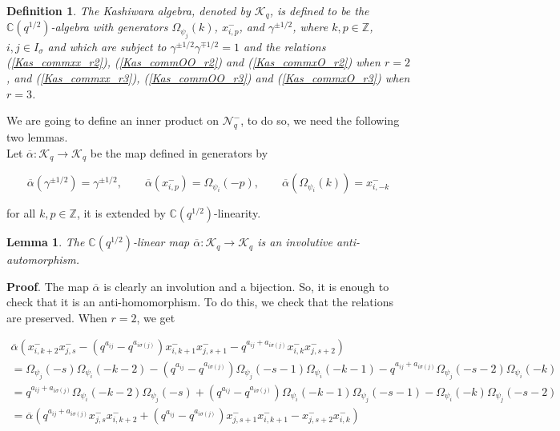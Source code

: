 \documentclass[12pt]{amsart}
\newtheorem{lem}[thm]{Lemma}
\newtheorem{defi}[thm]{Definition}
\numberwithin{equation}{section}
\newcommand{\dem }{\noindent\textbf{Proof}. }
\newcommand{\Z}{\ensuremath{\mathbb{Z}}}
\newcommand{\C}{\ensuremath{\mathbb{C}}}
\newcommand{\mc}[1]{\mathcal{#1}}
\begin{document}
\begin{defi}
    The Kashiwara algebra, denoted by $\mc{K}_q$, is defined to be the $\C(q^{1/2})$-algebra with generators $\Omega_{\psi_j}(k)$, $x_{i,p}^{-}$, and $\gamma^{\pm 1/2}$, where $k,p\in \Z$, $i,j\in I_\sigma$ and which are subject to $\gamma^{\pm 1/2}\gamma^{\mp 1/2} = 1$ and the relations (\ref{Kas_commxx_r2}), (\ref{Kas_commOO_r2}) and (\ref{Kas_commxO_r2}) when $r=2$, and (\ref{Kas_commxx_r3}), (\ref{Kas_commOO_r3}) and (\ref{Kas_commxO_r3}) when $r=3$.  
\end{defi}

We are going to define an inner product on $\mc{N}_q^-$, to do so, we need the following two lemmas. \\

Let $\overline{\alpha} : \mc{K}_q \to \mc{K}_q$ be the map defined in generators by

$$ \overline{\alpha}(\gamma^{\pm 1/2}) = \gamma^{\pm 1/2}, \quad \quad \overline{\alpha}(x^{-}_{i,p}) = \Omega_{\psi_i}(-p), \quad\quad \overline{\alpha}(\Omega_{\psi_i}(k)) = x^{-}_{i,-k}  $$

for all $k,p\in \Z$, it is extended by $\C(q^{1/2})$-linearity.

\begin{lem}
    The $\C(q^{1/2})$-linear map $\overline{\alpha} : \mc{K}_q \to \mc{K}_q$ is an involutive anti-automorphism. 
\end{lem}

\dem
    The map $\overline{\alpha}$ is clearly an involution and a bijection. So, it is enough to check that it is an anti-homomorphism. To do this, we check that the relations are preserved. When $r=2$, we get

    \begin{multline*}
        \overline{\alpha}(x_{i,k+2}^-x_{j,s}^- - (q^{a_{ij}} - q^{a_{i\sigma(j)}})x_{i,k+1}^-x_{j,s+1}^- - q^{a_{ij} + a_{i\sigma(j)}}x_{i,k}^-x_{j,s+2}^-) \\
        = \Omega_{\psi_j}(-s)\Omega_{\psi_i}(-k-2) - (q^{a_{ij}} - q^{a_{i\sigma(j)}})\Omega_{\psi_j}(-s-1)\Omega_{\psi_i}(-k-1) - q^{a_{ij} + a_{i\sigma(j)}}\Omega_{\psi_j}(-s-2)\Omega_{\psi_i}(-k)\\
        =q^{a_{ij} + a_{i\sigma(j)}}\Omega_{\psi_i}(-k-2)\Omega_{\psi_j}(-s) + (q^{a_{ij}} - q^{a_{i\sigma(j)}})\Omega_{\psi_i}(-k-1)\Omega_{\psi_j}(-s-1) - \Omega_{\psi_i}(-k)\Omega_{\psi_j}(-s-2) \\
        = \overline{\alpha}(q^{a_{ij} + a_{i\sigma(j)}}x_{j,s}^-x_{i,k+2}^- + (q^{a_{ij}} - q^{a_{i\sigma(j)}})x_{j,s+1}^-x_{i,k+1}^- - x_{j,s+2}^-x_{i,k}^-)
    \end{multline*}
\end{document}
